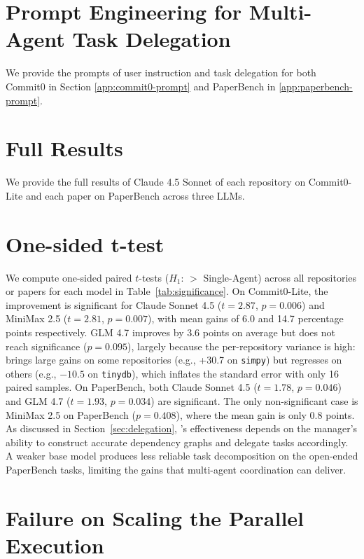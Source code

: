 \appendix

\section{Prompt Engineering for Multi-Agent Task Delegation}
We provide the prompts of user instruction and task delegation for both Commit0 in Section \ref{app:commit0-prompt} and PaperBench in \ref{app:paperbench-prompt}.

\section{Full Results}
We provide the full results of Claude 4.5 Sonnet of each repository on Commit0-Lite and each paper on PaperBench across three LLMs.




\section{One-sided t-test}
\label{app:stats-test}

We compute one-sided paired $t$-tests ($H_1$: \ourmethod $>$ Single-Agent) across all repositories or papers for each model in Table~\ref{tab:significance}. On Commit0-Lite, the improvement is significant for Claude Sonnet 4.5 ($t=2.87$, $p=0.006$) and MiniMax 2.5 ($t=2.81$, $p=0.007$), with mean gains of 6.0 and 14.7 percentage points respectively. GLM 4.7 improves by 3.6 points on average but does not reach significance ($p=0.095$), largely because the per-repository variance is high: \ourmethod brings large gains on some repositories (e.g., +30.7 on \texttt{simpy}) but regresses on others (e.g., $-10.5$ on \texttt{tinydb}), which inflates the standard error with only 16 paired samples. On PaperBench, both Claude Sonnet 4.5 ($t=1.78$, $p=0.046$) and GLM 4.7 ($t=1.93$, $p=0.034$) are significant. The only non-significant case is MiniMax 2.5 on PaperBench ($p=0.408$), where the mean gain is only 0.8 points. As discussed in Section~\ref{sec:delegation}, \ourmethod's effectiveness depends on the manager's ability to construct accurate dependency graphs and delegate tasks accordingly. A weaker base model produces less reliable task decomposition on the open-ended PaperBench tasks, limiting the gains that multi-agent coordination can deliver. 
\section{Failure on Scaling the Parallel Execution}
\label{app:failure-parallel}


